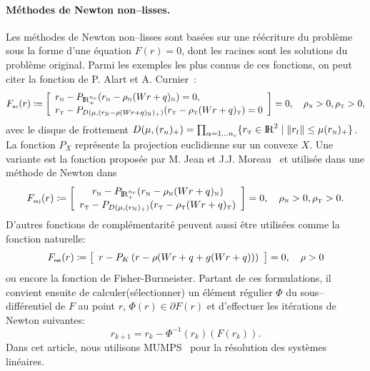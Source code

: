\documentclass{CSMA2017}
\def\RR{\nbR}
\def\nbR{\ensuremath{\mathrm{I\!R}}} %
\def\n{{\hbox{\tiny{N}}}}
\def\t{{\hbox{\tiny{T}}}}
\def\nat{{\hbox{\sf \tiny{nat}}}}
\def\ac{{\hbox{\tiny{ac}}}}
\def\mjtwo{{\hbox{\tiny{mj}}}}
\begin{document}
\paragraph{Méthodes de Newton non--lisses.} 
Les méthodes  de Newton non--lisses sont basées sur une réécriture du problème sous la forme d'une équation $F(r)=0$, dont les racines sont les solutions du problème original. Parmi les exemples les plus connus de ces fonctions, on peut citer la fonction de P. Alart et A. Curnier~\cite{Alart.Curnier1991}:
\begin{equation}
  \label{eq:AC-1}
 F_\ac(r) \coloneqq  
  \left[
  \begin{array}{l} 
    r_\n - P_{\RR^{n_c}_+}(r_\n - \rho_\n  (Wr+q)_\n) = 0, \\
    r_\t - P_{D(\mu, (r_\n - \rho (Wr+q)_\n)_+)}(r_\t - \rho_\t (Wr+q)_\t   )=0
  \end{array}
  \right] =0,\quad \rho_\n>0, \rho_\t>0,
\end{equation}
avec le disque de frottement  $D(\mu,(r_{n})_+) = \prod_{\alpha=1\ldots n_c} \{ r_\t \in \RR^2 \mid  \|r_t\| \leq \mu (r_\n)_+  \}$. La fonction $P_X$ représente la projection euclidienne sur un convexe $X$. Une variante  est la fonction proposée par M. Jean et J.J. Moreau~\cite{Jean.Moreau1987} et utilisée dans une méthode de Newton dans~\cite{Christensen.Klarbring.ea1998}
\begin{equation}
  \label{eq:MJ-II}
    F_{\mjtwo}(r) \coloneqq \left[ \begin{array}{c}
    r_\n - P_{\RR^{n_c}_+}(r_\n - \rho_\n (W r +  q)_\n) \\
    r_\t - P_{D(\mu, (r_{\n})_+)}(r_\t - \rho_\t (Wr+q)_\t   ) 
  \end{array}\right] =0,\quad \rho_\n>0, \rho_\t>0.
\end{equation}
 D'autres fonctions de complémentarité peuvent aussi être utilisées comme la fonction naturelle:
\begin{equation}
  \label{eq:natural-II}
  F_\nat(r) \coloneqq   \left[
  \begin{array}{l} 
    r - P_{K}\left(r  - \rho (Wr+q + g(Wr+q))\right)
  \end{array}\right] 
  = 0, \quad \rho >0
\end{equation}
ou encore la fonction de Fisher-Burmeister. Partant de ces formulations, il convient ensuite de calculer(sélectionner) un élément régulier $\Phi$ du sous--différentiel de $F$ au point $r$, $\Phi(r) \in \partial F(r)$ et d'effectuer les itérations de Newton suivantes:
\begin{equation}
  \label{eq:NSN3}
  r_{k+1}  =  r_k -  \Phi^{-1}(r_k) (F(r_k)).
\end{equation}
Dans cet article, nous utilisons MUMPS~\cite{Amestoy.ea_PC2006,Amestoy.ea_SIAMMAA2001} pour la résolution des systèmes linéaires.
\end{document}
